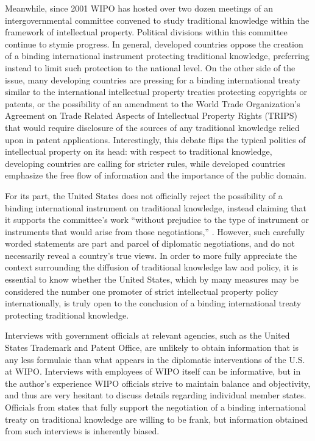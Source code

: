 \documentclass[12pt]{article}
\begin{document}
Meanwhile, since 2001 WIPO has hosted over two dozen meetings of an intergovernmental committee 
convened to study traditional knowledge within the framework of intellectual property. Political 
divisions within this committee continue to stymie progress. In general, developed countries 
oppose the creation of a binding international instrument protecting traditional knowledge, preferring 
instead to limit such protection to the national level. On the other side of the issue, many 
developing countries are pressing for a binding international treaty similar to the international 
intellectual property treaties protecting copyrights or patents, or the possibility of an amendment 
to the World Trade Organization's Agreement on Trade Related Aspects of Intellectual Property Rights 
(TRIPS) that would require disclosure of the sources of any traditional knowledge relied upon 
in patent applications. Interestingly, this debate flips the typical politics 
of intellectual property on its head: with respect to traditional knowledge, developing countries are 
calling for stricter rules, while developed countries emphasize the free flow of information and the 
importance of the public domain.

For its part, the United States does not officially reject the possibility of a binding international 
instrument on traditional knowledge, instead claiming that it supports the committee's work ``without 
prejudice to the type of instrument or instruments that would arise from those 
negotiations,'' \citep{world_intellectual_property_organization2013intergovernmental}.
However, such carefully worded statements are part and parcel of diplomatic negotiations, and 
do not necessarily reveal a country's true views.
In order to more fully appreciate the context surrounding the diffusion of traditional knowledge law 
and policy, it is essential to know whether the United States, which by many 
measures may be considered the number one promoter of strict intellectual property policy 
internationally, is truly open to the conclusion of a binding international treaty protecting 
traditional knowledge.

Interviews with government officials at relevant agencies, such as the United States Trademark and 
Patent Office, are unlikely to obtain information that is any less formulaic than what 
appears in the diplomatic interventions of the U.S. at WIPO. Interviews with employees of WIPO itself 
can be informative, but in the author's experience WIPO officials strive to maintain balance and objectivity, 
and thus are very 
hesitant to discuss details regarding individual member states. Officials from states that fully 
support the negotiation of a binding international treaty on traditional knowledge are willing to be 
frank, but information obtained from such interviews is inherently biased.
\end{document}

